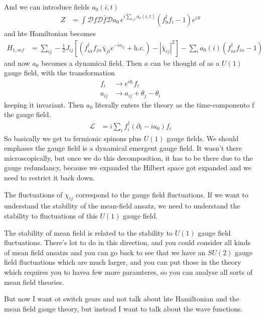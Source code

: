 And we can introduce fields $a_0(i, t)$ 
\begin{align}
    Z &=
    \int \mathcal{D} f \mathcal{D} \bar{f} \mathcal{D} a_0\,
    e^{i \sum_{i, t} a_0 (i, t)} \left( f_9^\dagger f_i - 1 \right)
    e^{iS}
\end{align}
and hte Hamiltonian becomes
\begin{align}
    H_{1,mf}
    &=
    \sum_{ij}
    -\frac{1}{2} J_{ij}
    \left[ 
    \left( 
    f_{i\alpha}^\dagger f_{j\alpha}
    \bar{\chi}_{ji} e^{-ia_{ij}}
    + \mathrm{h.c.}
    \right)
    -
    \left| \bar{\chi}_{ij} \right|^2
    \right]
    -
    \sum_{i} a_0\left( i \right) \left(
    f_{i\alpha}^\dagger f_{i\alpha} - 1
    \right)
\end{align}
and now $a_0$ becomes a dynamical field.
Then $a$ can be thought of as a $U(1)$ gauge field,
with the transformation
\begin{align}
    f_{i} &\to e^{i\theta_i} f_i\\
    a_{ij} &\to a_{ij} + \theta_j - \theta_i
\end{align}
keeping it invariant.
Then $a_0$ literally enters the theory as the time-componento f the gauge field.
\begin{align}
    \mathcal{L} &=
    i \sum_{i}
    f_i^\dagger \left( \partial_t - i a_0 \right) f_i
\end{align}
So basically we get to fermionic spinons plus $U(1)$ gauge fields.
We should emphases the gauge field is a dynamical emergent gauge field.
It wasn't there microscopically,
but once we do this decomposition,
it has to be there due to the gauge redundancy,
because we expanded the Hilbert space got expanded and we need to restrict it
back down.

The fluctuations of $\chi_{ij}$ correspond to the gauge field fluctuations.
If we want to understand the stability of the mean-field ansatz,
we need to understand the stability to fluctuations of this $U(1)$ gauge field.

The stability of mean field is related to the stability to $U(1)$ gauge field
fluctuations.
There's  lot to do in this direction,
and you could consider all kinds of mean field ansatzs and you can go back to
see that we have an $SU(2)$ gauge field fluctuations which are much larger,
and you can put those in the theory which requires you to havea few more
paramteres,
so you can analyse all sorts of mean field theories.

But now I want ot switch gears and not talk about hte Hamiltonian and the mean
field gauge theory,
but instead I want to talk about the wave functions.

